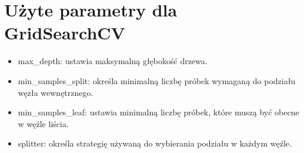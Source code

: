 {}
\section*{Użyte parametry dla GridSearchCV \cite{url_DecisionTreeRegressor, url_grid_search}}
\vspace{-1.0em}

\begin{itemize}
\setlength\itemsep{-0.5em}
\item max\_depth: ustawia maksymalną głębokość drzewa.
\item min\_samples\_split: określa minimalną liczbę próbek wymaganą do podziału węzła wewnętrznego.
\item min\_samples\_leaf: ustawia minimalną liczbę próbek, które muszą być obecne w węźle liścia.
\item splitter: określa strategię używaną do wybierania podziału w każdym węźle.
\end{itemize}

\noindent\makebox[\linewidth]{\rule{\paperwidth}{0.4pt}}